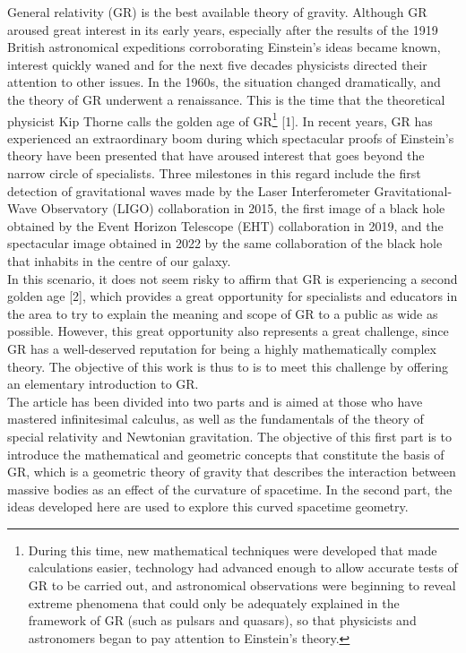 \documentclass[11pt,letterpaper]{article}
\begin{document}
General relativity (GR) is the best available theory of gravity. Although GR aroused great interest in its early years, especially after the results of the 1919 British astronomical expeditions corroborating Einstein's ideas became known, interest quickly waned and for the next five decades physicists directed their attention to other issues. In the 1960s, the situation changed dramatically, and the theory of GR underwent a renaissance. This is the time that the theoretical physicist Kip Thorne calls the golden age of GR\footnote{During this time, new mathematical techniques were developed that made calculations easier, technology had advanced enough to allow accurate tests of GR to be carried out, and astronomical observations were beginning to reveal extreme phenomena that could only be adequately explained in the framework of GR (such as pulsars and quasars), so that physicists and astronomers began to pay attention to Einstein’s theory.} [1]. In recent years, GR has experienced an extraordinary boom during which spectacular proofs of Einstein's theory have been presented that have aroused interest that goes beyond the narrow circle of specialists. Three milestones in this regard include the first detection of gravitational waves made by the Laser Interferometer Gravitational-Wave Observatory (LIGO) collaboration in 2015, the first image of a black hole obtained by the Event Horizon Telescope (EHT) collaboration in 2019, and the spectacular image obtained in 2022 by the same collaboration of the black hole that inhabits in the centre of our galaxy.\\

In this scenario, it does not seem risky to affirm that GR is experiencing a second golden age [2], which provides a great opportunity for specialists and educators in the area to try to explain the meaning and scope of GR to a public as wide as possible. However, this great opportunity also represents a great challenge, since GR has a well-deserved reputation for being a highly mathematically complex theory. The objective of this work is thus to is to meet this challenge by offering an elementary introduction to GR.\\

The article has been divided into two parts and is aimed at those who have mastered infinitesimal calculus, as well as the fundamentals of the theory of special relativity and Newtonian gravitation. The objective of this first part is to introduce the mathematical and geometric concepts that constitute the basis of GR, which is a geometric theory of gravity that describes the interaction between massive bodies as an effect of the curvature of spacetime. In the second part, the ideas developed here are used to explore this curved spacetime geometry.
\end{document}
